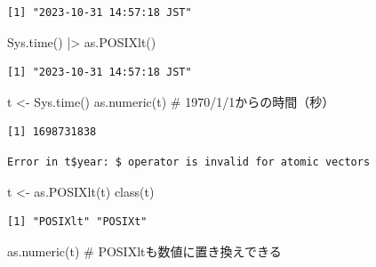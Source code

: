 \documentclass[
  letterpaper,
  DIV=11,
  numbers=noendperiod]{scrreprt}
\newenvironment{Shaded}{\begin{snugshade}}{\end{snugshade}}
\newcommand{\CommentTok}[1]{\textcolor[rgb]{0.37,0.37,0.37}{#1}}
\newcommand{\FunctionTok}[1]{\textcolor[rgb]{0.28,0.35,0.67}{#1}}
\newcommand{\NormalTok}[1]{\textcolor[rgb]{0.00,0.23,0.31}{#1}}
\newcommand{\OtherTok}[1]{\textcolor[rgb]{0.00,0.23,0.31}{#1}}
\newcommand{\SpecialCharTok}[1]{\textcolor[rgb]{0.37,0.37,0.37}{#1}}
\begin{document}
\begin{verbatim}
[1] "2023-10-31 14:57:18 JST"
\end{verbatim}

\begin{Shaded}
\begin{Highlighting}[]
\FunctionTok{Sys.time}\NormalTok{() }\SpecialCharTok{|\textgreater{}} \FunctionTok{as.POSIXlt}\NormalTok{()}
\end{Highlighting}
\end{Shaded}

\begin{verbatim}
[1] "2023-10-31 14:57:18 JST"
\end{verbatim}

\begin{Shaded}
\begin{Highlighting}[]
\NormalTok{t }\OtherTok{\textless{}{-}} \FunctionTok{Sys.time}\NormalTok{()}
\FunctionTok{as.numeric}\NormalTok{(t) }\CommentTok{\# 1970/1/1からの時間（秒）}
\end{Highlighting}
\end{Shaded}

\begin{verbatim}
[1] 1698731838
\end{verbatim}

\begin{Shaded}
\end{Shaded}

\begin{verbatim}
Error in t$year: $ operator is invalid for atomic vectors
\end{verbatim}

\begin{Shaded}
\begin{Highlighting}[]
\NormalTok{t }\OtherTok{\textless{}{-}} \FunctionTok{as.POSIXlt}\NormalTok{(t)}
\FunctionTok{class}\NormalTok{(t)}
\end{Highlighting}
\end{Shaded}

\begin{verbatim}
[1] "POSIXlt" "POSIXt" 
\end{verbatim}

\begin{Shaded}
\begin{Highlighting}[]
\FunctionTok{as.numeric}\NormalTok{(t) }\CommentTok{\# POSIXltも数値に置き換えできる}
\end{Highlighting}
\end{Shaded}
\end{document}
